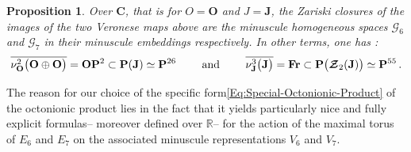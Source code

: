 \documentclass[11pt]{amsart}
\newtheorem{prop}[thm]{Proposition}
\begin{document}
\begin{prop}%
Over $\mathbf C$, that is for $O=\mathbf O$ and $J=\mathbf J$, the Zariski closures of the images of the two Veronese maps above are the minuscule homogeneous spaces 
$\boldsymbol{\mathcal G}_6$ and $\boldsymbol{\mathcal G}_7$ in their minuscule embeddings respectively. In other terms, one has : 
$$ 
\overline{\nu_{\mathbf O}^2\big(\mathbf O\oplus \mathbf O\big)}=\mathbf  O\mathbf P^2\subset \mathbf P(\mathbf J)\simeq \mathbf P^{26}
\qquad 
\mbox{ and } 
\qquad 
\overline{\nu_{\mathbf J}^3\big(\mathbf J\big)}={\bf Fr} 
\subset 
\mathbf P\big(\boldsymbol{\mathcal Z}_2(\mathbf J)\big)\simeq
\mathbf P^{55}\, . 
$$
\end{prop}%



The reason for our choice of the specific form\eqref{Eq:Special-Octonionic-Product} of the octonionic product lies in the fact that it yields particularly nice and fully explicit formulas-- moreover defined over \( \mathbb{R} \)-- for the action of the maximal torus of \( E_6 \) and \( E_7 \) on the associated minuscule representations \( V_6 \) and \( V_7 \). 
\end{document}
